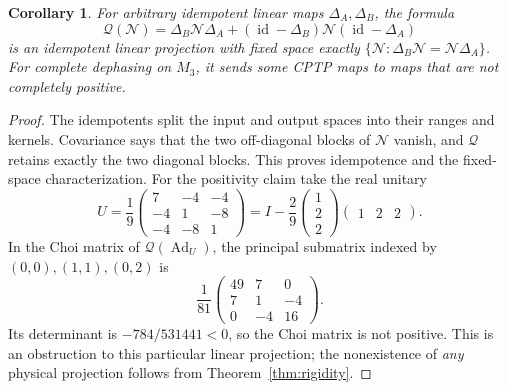 \documentclass[11pt]{article}
\newtheorem{corollary}[theorem]{Corollary}
\newcommand{\Ad}{\operatorname{Ad}}
\newcommand{\id}{\operatorname{id}}
\begin{document}
\begin{corollary}\label{cor:linear}
For arbitrary idempotent linear maps $\Delta_A,\Delta_B$, the formula
\[
 \mathcal Q(\mathcal N)=\Delta_B\mathcal N\Delta_A
       +(\id-\Delta_B)\mathcal N(\id-\Delta_A)
\]
is an idempotent linear projection with fixed space exactly
$\{\mathcal N:\Delta_B\mathcal N=\mathcal N\Delta_A\}$.
For complete dephasing on $M_3$, it sends some CPTP maps to maps that
are not completely positive.
\end{corollary}
\begin{proof}
The idempotents split the input and output spaces into their ranges and
kernels. Covariance says that the two off-diagonal blocks of
$\mathcal N$ vanish, and $\mathcal Q$ retains exactly the two diagonal
blocks. This proves idempotence and the fixed-space characterization.
For the positivity claim take the real unitary
\[
 U=\frac19\begin{pmatrix}7&-4&-4\\-4&1&-8\\-4&-8&1\end{pmatrix}
   =I-\frac29\begin{pmatrix}1\\2\\2\end{pmatrix}
                  \begin{pmatrix}1&2&2\end{pmatrix}.
\]
In the Choi matrix of $\mathcal Q(\Ad_U)$, the principal submatrix indexed
by $(0,0),(1,1),(0,2)$ is
\[
 \frac1{81}\begin{pmatrix}49&7&0\\7&1&-4\\0&-4&16\end{pmatrix}.
\]
Its determinant is $-784/531441<0$, so the Choi matrix is not positive.
This is an obstruction to this particular linear projection; the
nonexistence of \emph{any} physical projection follows from
Theorem~\ref{thm:rigidity}.
\end{proof}
\end{document}
